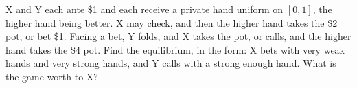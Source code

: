 \begin{question}\label{iq:iv1:games:20}
X and Y each ante \$1 and each receive a private hand uniform on $[0, 1]$, the higher hand being better. X may check, and then the higher hand takes the \$2 pot, or bet \$1. Facing a bet, Y folds, and X takes the pot, or calls, and the higher hand takes the \$4 pot. Find the equilibrium, in the form: X bets with very weak hands and very strong hands, and Y calls with a strong enough hand. What is the game worth to X?
\end{question}
